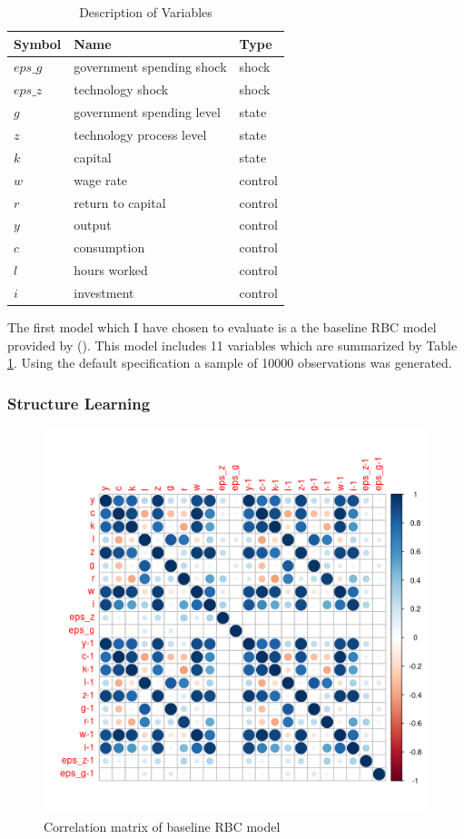 \documentclass{article}
\begin{document}
\begin{table}
  \centering
  \begin{tabular}{|l|l|l|}
    \hline
    Symbol & Name & Type \\
    \hline
    $eps\_g$ & government spending shock & shock \\
    $eps\_z$ & technology shock & shock \\
    $g$ & government spending level & state \\
    $z$ & technology process level & state \\
    $k$ & capital & state \\
    $w$ & wage rate & control \\
    $r$ & return to capital & control \\
    $y$ & output & control \\
    $c$ & consumption & control \\
    $l$ & hours worked & control \\
    $i$ & investment & control \\ \cline{2-2}
    \hline
  \end{tabular}
  \caption{Description of Variables}
  \label{tab1}
\end{table}

The first model which I have chosen to evaluate is a the baseline RBC model provided by \citeauthor{pfeifer2020} (\citeyear{pfeifer2020}). This model includes 11 variables which are summarized by Table \ref{tab1}. Using the default specification a sample of 10000 observations was generated. 

\subsubsection{Structure Learning}

\begin{figure}
  \centering
  \includegraphics[width=0.8\linewidth]{images/rbc_correlation.png}
  \caption{Correlation matrix of baseline RBC model}
  \label{rbccorr}
\end{figure}
\end{document}
